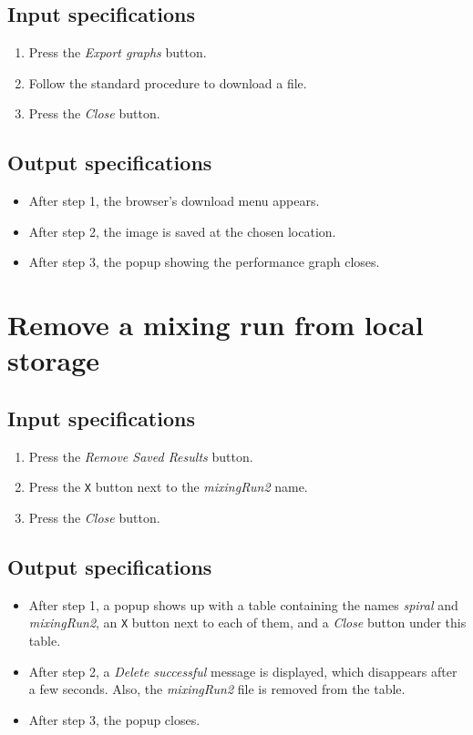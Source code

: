\subsection*{Input specifications}
\begin{enumerate}
\item Press the \emph{Export graphs} button.
\item Follow the standard procedure to download a file.
\item Press the \emph{Close} button.
\end{enumerate}

\subsection*{Output specifications}
\begin{itemize}
\item After step 1, the browser's download menu appears.
\item After step 2, the image is saved at the chosen location.
\item After step 3, the popup showing the performance graph closes.
\end{itemize}
 
\section{Remove a mixing run from local storage}

\subsection*{Input specifications}
\begin{enumerate}
\item Press the \emph{Remove Saved Results} button.
\item Press the \texttt{X} button next to the \emph{mixingRun2} name.
\item Press the \emph{Close} button.
\end{enumerate}

\subsection*{Output specifications}
\begin{itemize}
\item After step 1, a popup shows up with a table containing the names \emph{spiral} and \emph{mixingRun2}, an \texttt{X} button next to each of them, and a \emph{Close} button under this table.
\item After step 2, a \emph{Delete successful} message is displayed, which disappears after a few seconds. Also, the \emph{mixingRun2} file is removed from the table.
\item After step 3, the popup closes.
\end{itemize}

